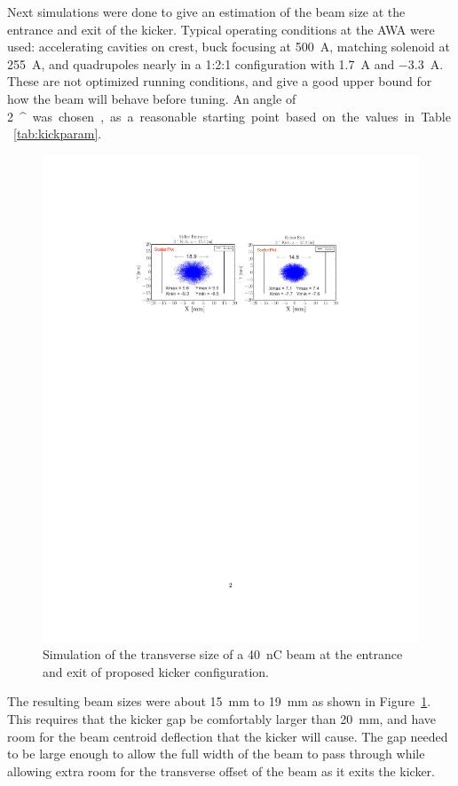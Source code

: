 \documentclass[aps,prab,preprint,groupedaddress,linenumbers]{revtex4-2}
\begin{document}
Next simulations were done to give an estimation of the beam size at the entrance and exit of the kicker.
Typical operating conditions at the AWA were used: accelerating cavities on crest, buck focusing at \SI{500}{A}, 
matching solenoid at \SI{255}{A}, and quadrupoles nearly in a 1:2:1 configuration with \SI{1.7}{A} and \SI{-3.3}{A}.
These are not optimized running conditions, and give a good upper bound for how the beam will behave before tuning.
An angle of \SI{2}{^\circ} was chosen, as a reasonable starting point based on the values in Table~\ref{tab:kickparam}. 
\begin{figure}
\includegraphics[width=\textwidth]{scatter_kicker}
	\caption{Simulation of the transverse size of a \SI{40}{nC} 
		beam at the entrance and exit of proposed kicker configuration.}
	\label{fig:beamsizekicker}
\end{figure}  
The resulting beam sizes were about \SI{15}{mm} to \SI{19}{mm} as shown in Figure~\ref{fig:beamsizekicker}. 
This requires that the kicker gap be comfortably larger than \SI{20}{mm}, 
and have room for the beam centroid deflection that the kicker will cause.
The gap needed to be large enough to allow the full width of the beam to pass through while allowing extra room
for the transverse offset of the beam as it exits the kicker. 
\end{document}
